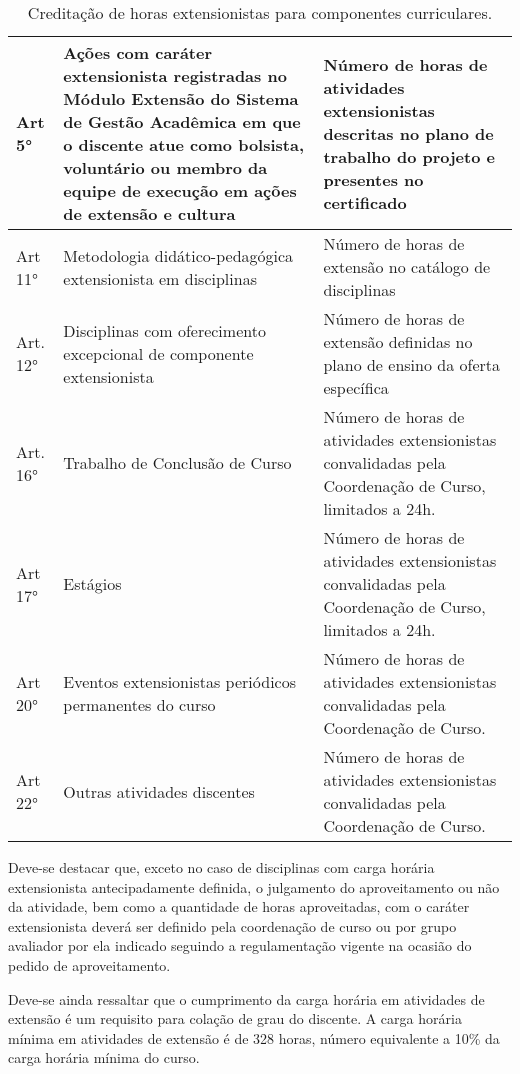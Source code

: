 \begin{table}[h!]
   \caption{Creditação de horas extensionistas para componentes curriculares.}
   \label{tab:componentes-ext}\centering
   \begin{tabular}{|p{}|p{}|p{}|}
      \hline
      Art 5°
      &
        Ações  com caráter  extensionista  registradas no  Módulo Extensão  do
        Sistema  de Gestão  Acadêmica em  que o  discente atue  como bolsista,
        voluntário ou  membro da  equipe de  execução em  ações de  extensão e
        cultura
      &
        Número de horas de atividades extensionistas descritas no plano de
        trabalho do projeto e presentes no certificado
      \\
      \hline
      Art 11°
      &
        Metodologia didático-pedagógica extensionista em disciplinas
      &
        Número de horas de extensão no catálogo de disciplinas
      \\
      \hline
      Art. 12°
      &
        Disciplinas com oferecimento excepcional de componente extensionista
      &
        Número de horas de extensão definidas no plano de ensino da oferta
        específica
     \\
           \hline
      Art. 16°
      &
        Trabalho de Conclusão de Curso
      &
        Número de horas de atividades extensionistas convalidadas pela
        Coordenação de Curso, limitados a 24h.
      \\

      \hline
      Art 17°
      &
        Estágios
      &
        Número de horas de atividades extensionistas convalidadas pela
        Coordenação de Curso, limitados a 24h.
      \\
      \hline
      Art 20°
      &
        Eventos extensionistas periódicos permanentes do curso
      &
        Número  de  horas  de   atividades  extensionistas  convalidadas  pela
        Coordenação de Curso.
      \\
      \hline
      Art 22°
      &
        Outras atividades discentes
      &
        Número de horas de atividades extensionistas convalidadas pela
        Coordenação de Curso.
      \\
      \hline
    \end{tabular}
  \end{table}

Deve-se destacar que, exceto no caso de disciplinas com carga horária
extensionista antecipadamente definida, o julgamento do aproveitamento
ou não da atividade, bem como a quantidade de horas aproveitadas, com
o caráter extensionista deverá ser definido pela coordenação de curso
ou por grupo avaliador por ela indicado seguindo a regulamentação
vigente na ocasião do pedido de aproveitamento.

Deve-se ainda ressaltar que o cumprimento da carga horária em
atividades de extensão é um requisito para colação de grau do
discente. A carga horária mínima em atividades de extensão é de 328
horas, número equivalente a 10\% da carga horária mínima do curso.
